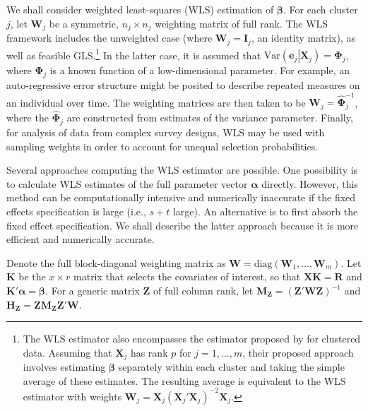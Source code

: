 \documentclass[12pt]{article}\usepackage[]{graphicx}\usepackage[]{color}
\newcommand{\Var}{\text{Var}}
\newcommand{\bm}{\mathbf}
\newcommand{\bs}{\boldsymbol}
\begin{document}
We shall consider weighted least-squares (WLS) estimation of $\bs\beta$. 
For each cluster $j$, let $\bm{W}_j$ be a symmetric, $n_j \times n_j$ weighting matrix of full rank. 
The WLS framework includes the unweighted case (where $\bm{W}_j = \bm{I}_j$, an identity matrix), as well as feasible GLS.\footnote{
The WLS estimator also encompasses the estimator proposed by \citet{Ibragimov2010tstatistic} for clustered data. 
Assuming that $\bm{X}_j$ has rank $p$ for $j = 1,...,m$, their proposed approach involves estimating $\bs\beta$ separately within each cluster and taking the simple average of these estimates. 
The resulting average is equivalent to the WLS estimator with weights $\bm{W}_j = \bm{X}_j \left(\bm{X}_j'\bm{X}_j\right)^{-2} \bm{X}_j$.} 
In the latter case, it is assumed that $\Var\left(\bm{e}_j\left|\bm{X}_j\right.\right) = \bs\Phi_j$, where $\bs\Phi_j$ is a known function of a low-dimensional parameter. 
For example, an auto-regressive error structure might be posited to describe repeated measures on an individual over time. 
The weighting matrices are then taken to be $\bm{W}_j = \hat{\bs\Phi}_j^{-1}$, where the $\hat{\bs\Phi}_j$ are constructed from estimates of the variance parameter.
Finally, for analysis of data from complex survey designs, WLS may be used with sampling weights in order to account for unequal selection probabilities.

Several approaches computing the WLS estimator are possible. 
One possibility is to calculate WLS estimates of the full parameter vector $\bs\alpha$ directly. 
However, this method can be computationally intensive and numerically inaccurate if the fixed effects specification is large (i.e., $s + t$ large). 
An alternative is to first absorb the fixed effect specification. We shall describe the latter approach because it is more efficient and numerically accurate.

Denote the full block-diagonal weighting matrix as $\bm{W} = \text{diag}\left(\bm{W}_1,...,\bm{W}_m\right)$.
Let $\bm{K}$ be the $x \times r$ matrix that selects the covariates of interest, so that $\bm{X} \bm{K} = \bm{R}$ and $\bm{K}'\bs\alpha = \bs\beta$.
For a generic matrix $\bm{Z}$ of full column rank, let $\bm{M_Z} = \left(\bm{Z}'\bm{W}\bm{Z}\right)^{-1}$ and $\bm{H_Z} = \bm{Z}\bm{M_Z}\bm{Z}'\bm{W}$. 
\end{document}
